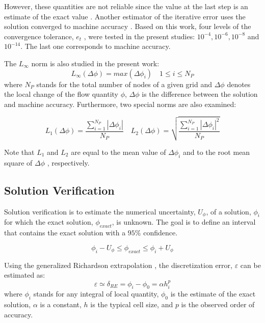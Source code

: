 \documentclass{cfdsc}
\begin{document}
\begin{multicols}{2}
However, these quantities are not reliable since the value at the last step is an estimate of the exact value \cite{ref6}. Another estimator of the iterative error uses the solution converged to machine accuracy \cite{ref7}. Based on this work, four levels of the convergence tolerance, $e_t$ , were tested in the present studies: $ 10^{-4}, 10^{-6}, 10^{-8} $ and $ 10^{-14} $. The last one corresponds to machine accuracy.

The $L_\infty $ norm is also studied in the present work:
\begin{equation}\label{eq_3}
L_{\infty} \left( \Delta \phi \right) = max \left( \Delta \phi_i \right)   \quad 1\leq i \leq N_P
\end{equation}
where $N_P$ stands for the total number of nodes of a given grid and $\Delta \phi$ denotes the local change of the flow quantity $\phi$, $\Delta \phi$ is the difference between the solution and machine accuracy. Furthermore, two special norms are also examined:

\begin{equation}\label{eq_4}
L_{1} \left( \Delta \phi \right) = \frac{\sum_{i=1}^{N_P} 	\left| \Delta \phi_i \right| }{N_P}   \quad  L_{2} \left( \Delta \phi \right) = \sqrt{\frac{\sum_{i=1}^{N_P} 	\left| \Delta \phi_i \right|^2 }{N_P}} 
\end{equation}

Note that $L_1$ and $L_2$ are equal to the mean value of $\Delta \phi_i$  and to the root mean square of $\Delta \phi$ , respectively. 

\subsection{Solution Verification}
Solution verification is to estimate the numerical uncertainty, $U_{\phi}$, of a solution,  $\phi_i$ for which the exact solution, $\phi_{exact}$, is unknown. The goal is to define an interval that contains the exact solution with a $ 95\% $ confidence.

\begin{equation}\label{eq_5}
\phi_i-U_{\phi} \leq \phi_{exact} \leq \phi_i+U_{\phi}
\end{equation}

Using the generalized Richardson extrapolation \cite{ref8}, the discretization error, $\varepsilon$ can be estimated as:
\begin{equation}\label{eq_6}
\varepsilon \simeq \delta_{RE} =\phi_i - \phi_0 = \alpha h_i^p
\end{equation}
where $\phi_i$ stands for any integral of local quantity,  $\phi_0$ is the estimate of the exact solution, $\alpha$  is a constant, $h$ is the typical cell size, and $p$ is the observed order of accuracy. 



\end{multicols}
\end{document}
